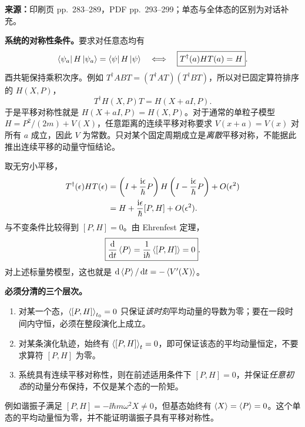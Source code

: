 \textbf{来源：}印刷页 pp.~283--289，PDF pp.~293--299；单态与全体态的区别为对话补充。

\textbf{系统的对称性条件。}要求对任意态均有
\begin{equation}
  \left\langle \psi_a\right|H\left|\psi_a\right\rangle=\left\langle \psi\right| H\left|\psi\right\rangle
  \quad\Longleftrightarrow\quad
  \boxed{T^\dagger(a)HT(a)=H}.
\end{equation}
酉共轭保持乘积次序。例如 $T^\dagger ABT=(T^\dagger AT)(T^\dagger BT)$，所以对已固定算符排序的 $H(X,P)$，
\begin{equation}
  T^\dagger H(X,P)T=H(X+aI,P).
\end{equation}
于是平移对称性就是 $H(X+aI,P)=H(X,P)$。对于通常的单粒子模型 $H=P^2/(2m)+V(X)$，任意距离的连续平移对称要求 $V(x+a)=V(x)$ 对所有 $a$ 成立，因此 $V$ 为常数。只对某个固定周期成立是\emph{离散}平移对称，不能据此推出连续平移的动量守恒结论。

取无穷小平移，
\begin{align}
  T^\dagger(\epsilon)HT(\epsilon)
   &=\left(I+\frac{\mathrm{i}\epsilon}{\hbar}P\right)
        H\left(I-\frac{\mathrm{i}\epsilon}{\hbar}P\right)
      +O(\epsilon^2)\notag\\
   &=H+\frac{\mathrm{i}\epsilon}{\hbar}[P,H]+O(\epsilon^2).
\end{align}
与不变条件比较得到 $[P,H]=0$。由 Ehrenfest 定理，
\begin{equation}
  \boxed{\frac{\mathop{}\!\mathrm{d}}{\mathop{}\!\mathrm{d} t}\left\langle P \right\rangle
     =\frac1{\mathrm{i}\hbar}\left\langle [P,H] \right\rangle=0}.
\end{equation}
对上述标量势模型，这也就是 $\mathop{}\!\mathrm{d}\left\langle P \right\rangle/\mathop{}\!\mathrm{d} t=-\left\langle V'(X) \right\rangle$。

\textbf{必须分清的三个层次。}
\begin{enumerate}
  \item 对某一个态，$\left\langle [P,H] \right\rangle_{t_0}=0$ 只保证\emph{该时刻}平均动量的导数为零；要在一段时间内守恒，必须在整段演化上成立。
  \item 对某条演化轨迹，始终有 $\left\langle [P,H] \right\rangle_t=0$，即可保证该态的平均动量恒定，不要求算符 $[P,H]$ 为零。
  \item 系统具有连续平移对称性，则在前述适用条件下 $[P,H]=0$，并保证\emph{任意初态}的动量分布保持，不仅是某个态的一阶矩。
\end{enumerate}
例如谐振子满足 $[P,H]=-\ii\hbar m\omega^2X\ne0$，但基态始终有 $\left\langle X \right\rangle=\left\langle P \right\rangle=0$。这个单态的平均动量恒为零，并不能证明谐振子具有平移对称性。

